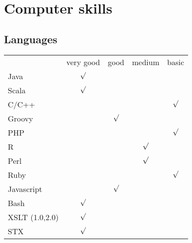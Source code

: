 \documentclass[11pt,a4paper,german]{moderncv}
\begin{document}
\newpage
\section{Computer skills}
\subsection{Languages}
\setlength{\tabcolsep}{12pt}
{
\begin{tabular}{l*{4}{c}}
& very good & good & medium & basic \\
Java & $ \surd $ & & & \\
Scala & $ \surd $ & & & \\
C/C++ & & & & $\surd$ \\
Groovy & & $\surd$ & &  \\
PHP & & & & $\surd$ \\
R & & & $\surd$ &  \\
Perl & & & $\surd$ &  \\
Ruby & & & & $\surd$ \\
Javascript & & $\surd$ & & \\
Bash & $\surd$ & & &  \\
XSLT (1.0,2.0) & $\surd$ & & &  \\
STX & $\surd$ & & &  \\
\end{tabular}
}{}
\end{document}

